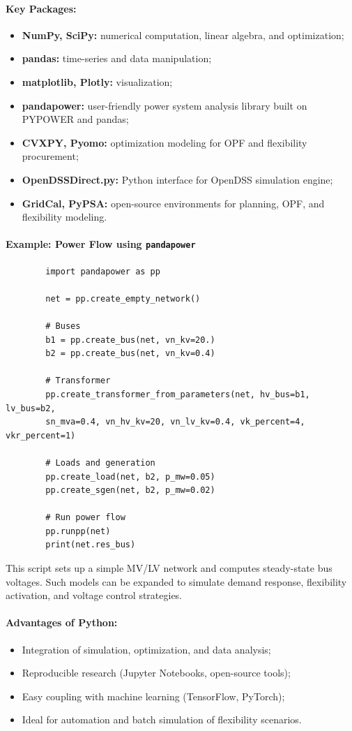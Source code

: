 \documentclass[11pt]{article}
\begin{document}
	\paragraph{Key Packages:}
	\begin{itemize}
		\item \textbf{NumPy, SciPy:} numerical computation, linear algebra, and optimization;
		\item \textbf{pandas:} time-series and data manipulation;
		\item \textbf{matplotlib, Plotly:} visualization;
		\item \textbf{pandapower:} user-friendly power system analysis library built on PYPOWER and pandas;
		\item \textbf{CVXPY, Pyomo:} optimization modeling for OPF and flexibility procurement;
		\item \textbf{OpenDSSDirect.py:} Python interface for OpenDSS simulation engine;
		\item \textbf{GridCal, PyPSA:} open-source environments for planning, OPF, and flexibility modeling.
	\end{itemize}
	
	\paragraph{Example: Power Flow using \texttt{pandapower}}
	
	\begin{verbatim}
		import pandapower as pp
		
		net = pp.create_empty_network()
		
		# Buses
		b1 = pp.create_bus(net, vn_kv=20.)
		b2 = pp.create_bus(net, vn_kv=0.4)
		
		# Transformer
		pp.create_transformer_from_parameters(net, hv_bus=b1, lv_bus=b2,
		sn_mva=0.4, vn_hv_kv=20, vn_lv_kv=0.4, vk_percent=4, vkr_percent=1)
		
		# Loads and generation
		pp.create_load(net, b2, p_mw=0.05)
		pp.create_sgen(net, b2, p_mw=0.02)
		
		# Run power flow
		pp.runpp(net)
		print(net.res_bus)
	\end{verbatim}
	
	This script sets up a simple MV/LV network and computes steady-state bus voltages.  
	Such models can be expanded to simulate demand response, flexibility activation, and voltage control strategies.
	
	\paragraph{Advantages of Python:}
	\begin{itemize}
		\item Integration of simulation, optimization, and data analysis;
		\item Reproducible research (Jupyter Notebooks, open-source tools);
		\item Easy coupling with machine learning (TensorFlow, PyTorch);
		\item Ideal for automation and batch simulation of flexibility scenarios.
	\end{itemize}
	
\end{document}
